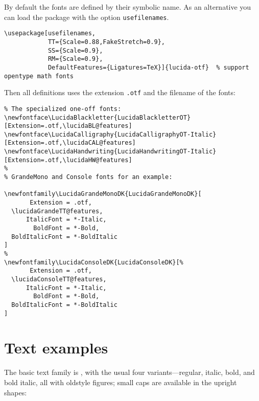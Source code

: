 \documentclass[11pt]{article}
\begin{document}
By default the fonts are defined by their symbolic name. As an alternative you can load 
the package with the option \texttt{usefilenames}. 

\begin{verbatim}
\usepackage[usefilenames,
            TT={Scale=0.88,FakeStretch=0.9},
            SS={Scale=0.9},
            RM={Scale=0.9},
            DefaultFeatures={Ligatures=TeX}]{lucida-otf}  % support opentype math fonts
\end{verbatim}



Then all definitions uses the
extension \texttt{.otf} and the filename of the fonts:

\begin{verbatim}
% The specialized one-off fonts:
\newfontface\LucidaBlackletter{LucidaBlackletterOT}[Extension=.otf,\lucidaBL@features]
\newfontface\LucidaCalligraphy{LucidaCalligraphyOT-Italic}[Extension=.otf,\lucidaCAL@features]
\newfontface\LucidaHandwriting{LucidaHandwritingOT-Italic}[Extension=.otf,\lucidaHW@features]
%
% GrandeMono and Console fonts for an example:

\newfontfamily\LucidaGrandeMonoDK{LucidaGrandeMonoDK}[
       Extension = .otf,
  \lucidaGrandeTT@features,
      ItalicFont = *-Italic,
        BoldFont = *-Bold,
  BoldItalicFont = *-BoldItalic
]
%
\newfontfamily\LucidaConsoleDK{LucidaConsoleDK}[%
       Extension = .otf,
  \lucidaConsoleTT@features,
      ItalicFont = *-Italic,
        BoldFont = *-Bold,
  BoldItalicFont = *-BoldItalic
]
\end{verbatim}

\section{Text examples}

\newcommand\demotext{%
  For \textsterling 45, almost anything can
  be found floating in fields. 
  !`THE DAZED BROWN FOX QUICKLY GAVE 12345--67890 JUMPS!
  --- ?`But aren't Kafka's Schlo\ss{} and
  \AE sop's \OE uvres often na\"\i ve vis-\`a-vis the d\ae monic
  ph\oe nix's official r\^ole in fluffy souffl\'es?}

\newcommand*\demotextsc{\textsc{\ Sphinx of black quartz, judge my vow}.}

\newcommand*\otfoldstylenums{\addfontfeatures{Numbers={OldStyle}}}
\newcommand*\demotextosf{\ \otfoldstylenums{0123456789}.}

The basic text family is , with the usual four
variants---\allowbreak regular, italic, bold, and bold italic, all with
oldstyle figures; small caps are available in the upright shapes:
\end{document}
